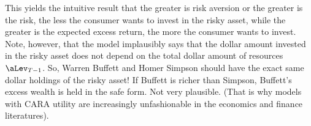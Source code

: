 This yields the intuitive result that the greater is risk aversion or
the greater is the risk, the less the consumer wants to invest in the
risky asset, while the greater is the expected excess return, the more
the consumer wants to invest.  Note, however, that the model
implausibly says that the dollar amount invested in the risky asset
does not depend on the total dollar amount of resources $\aLev_{T-1}$.
So, Warren Buffett and Homer Simpson should have the exact same dollar
holdings of the risky asset!  If Buffett is richer than Simpson, Buffett's
excess wealth is held in the safe form.  Not very plausible.  (That is why
models with CARA utility are increasingly unfashionable in the economics and finance literatures).


